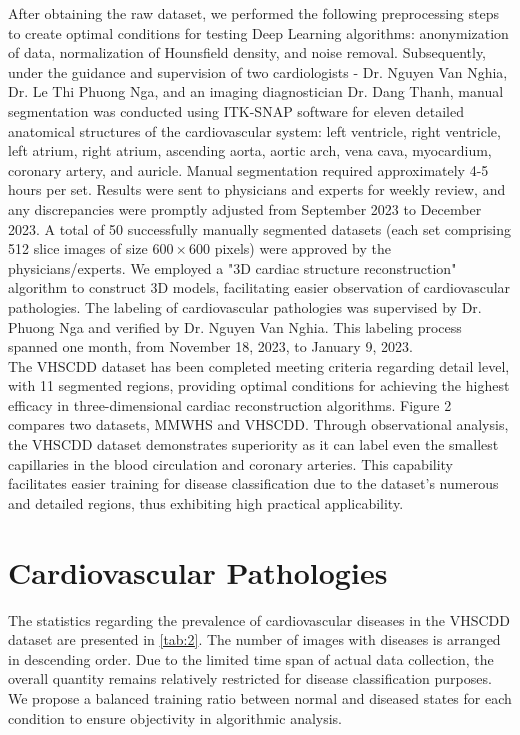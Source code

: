 \documentclass{article}
\begin{document}
After obtaining the raw dataset, we performed the following preprocessing steps to create optimal conditions for testing Deep Learning algorithms: anonymization of data, normalization of Hounsfield density, and noise removal. Subsequently, under the guidance and supervision of two cardiologists - Dr. Nguyen Van Nghia, Dr. Le Thi Phuong Nga, and an imaging diagnostician Dr. Dang Thanh, manual segmentation was conducted using ITK-SNAP software for eleven detailed anatomical structures of the cardiovascular system: left ventricle, right ventricle, left atrium, right atrium, ascending aorta, aortic arch, vena cava, myocardium, coronary artery, and auricle. Manual segmentation required approximately 4-5 hours per set. Results were sent to physicians and experts for weekly review, and any discrepancies were promptly adjusted from September 2023 to December 2023. A total of 50 successfully manually segmented datasets (each set comprising 512 slice images of size $600 \times 600$ pixels) were approved by the physicians/experts. We employed a "3D cardiac structure reconstruction" algorithm to construct 3D models, facilitating easier observation of cardiovascular pathologies. The labeling of cardiovascular pathologies was supervised by Dr. Phuong Nga and verified by Dr. Nguyen Van Nghia. This labeling process spanned one month, from November 18, 2023, to January 9, 2023. \\

The VHSCDD dataset has been completed meeting criteria regarding detail level, with 11 segmented regions, providing optimal conditions for achieving the highest efficacy in three-dimensional cardiac reconstruction algorithms. Figure 2 compares two datasets, MMWHS and VHSCDD. Through observational analysis, the VHSCDD dataset demonstrates superiority as it can label even the smallest capillaries in the blood circulation and coronary arteries. This capability facilitates easier training for disease classification due to the dataset's numerous and detailed regions, thus exhibiting high practical applicability.



\section{Cardiovascular Pathologies}
The statistics regarding the prevalence of cardiovascular diseases in the VHSCDD dataset are presented in \ref{tab:2}. The number of images with diseases is arranged in descending order. Due to the limited time span of actual data collection, the overall quantity remains relatively restricted for disease classification purposes. We propose a balanced training ratio between normal and diseased states for each condition to ensure objectivity in algorithmic analysis.
\end{document}

